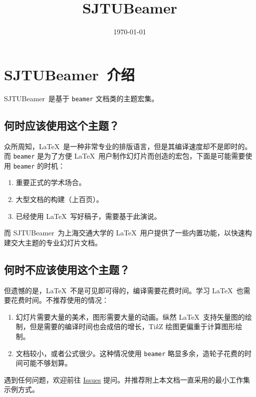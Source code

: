 \documentclass[
    UTF8,
    heading=true,
    12pt,
    a4paper
]{ctexrep}
\def\themename{\textsf{SJTUBeamer}}
\begin{document}
    \title{\themename}
    \date{\today}

    \chapter*{\themename\ 介绍}

    \themename\ 是基于 \verb"beamer" 文档类的主题宏集。

    \section*{何时应该使用这个主题？}
    众所周知，\LaTeX\ 是一种非常专业的排版语言，但是其编译速度却不是即时的。而 \texttt{beamer} 是为了方便 \LaTeX\ 用户制作幻灯片而创造的宏包，下面是可能需要使用 \texttt{beamer} 的时机：
    \begin{enumerate}
        \item 重要正式的学术场合。
        \item 大型文档的构建（上百页）。
        \item 已经使用 \LaTeX\ 写好稿子，需要基于此演说。
    \end{enumerate}

    而 \themename\ 为上海交通大学的 \LaTeX\ 用户提供了一些内置功能，以快速构建交大主题的专业幻灯片文档。

    \section*{何时不应该使用这个主题？}
    但遗憾的是，\LaTeX\ 不是可见即可得的，编译需要花费时间。学习 \LaTeX\ 也需要花费时间。不推荐使用的情况：
    \begin{enumerate}
        \item 幻灯片需要大量的美术，图形需要大量的动画。纵然 \LaTeX\ 支持矢量图的绘制，但是需要的编译时间也会成倍的增长，Ti\emph{k}Z 绘图更偏重于计算图形绘制。
        \item 文档较小，或者公式很少。这种情况使用 \texttt{beamer} 略显多余，造轮子花费的时间可能不够划算。
    \end{enumerate}

    遇到任何问题，欢迎前往 \href{https://github.com/sjtug/SJTUBeamer/issues}{Issues} 提问。并推荐附上本文档一直采用的最小工作集示例方式。

    \setcounter{tocdepth}{0}
    \tableofcontents
\end{document}
